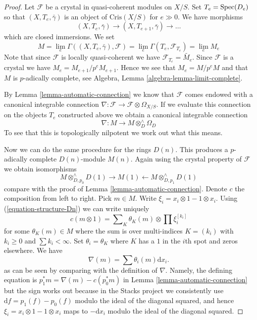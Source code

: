 \begin{proof}
Let $\mathcal{F}$ be a crystal in quasi-coherent modules on $X/S$.
Set $T_e = \mathop{\mathrm{Spec}}(D_e)$ so that $(X, T_e, \bar\gamma)$ is an object
of $\text{Cris}(X/S)$ for $e \gg 0$. We have morphisms
$$
(X, T_e, \bar\gamma) \to (X, T_{e + 1}, \bar\gamma) \to \ldots
$$
which are closed immersions. We set
$$
M =
\lim_e \Gamma((X, T_e, \bar\gamma), \mathcal{F}) =
\lim_e \Gamma(T_e, \mathcal{F}_{T_e}) = \lim_e M_e
$$
Note that since $\mathcal{F}$ is locally quasi-coherent we have
$\mathcal{F}_{T_e} = \widetilde{M_e}$. Since $\mathcal{F}$ is a
crystal we have $M_e = M_{e + 1}/p^eM_{e + 1}$. Hence we see that
$M_e = M/p^eM$ and that $M$ is $p$-adically complete, see
Algebra, Lemma \ref{algebra-lemma-limit-complete}.

\medskip\noindent
By Lemma \ref{lemma-automatic-connection} we know that $\mathcal{F}$
comes endowed with a canonical integrable connection
$\nabla : \mathcal{F} \to \mathcal{F} \otimes \Omega_{X/S}$.
If we evaluate this connection on the objects $T_e$ constructed above
we obtain a canonical integrable connection
$$
\nabla : M \longrightarrow M \otimes^\wedge_D \Omega_D
$$
To see that this is topologically nilpotent we work out what this means.

\medskip\noindent
Now we can do the same procedure for the rings $D(n)$.
This produces a $p$-adically complete $D(n)$-module $M(n)$. Again using
the crystal property of $\mathcal{F}$ we obtain isomorphisms
$$
M \otimes^\wedge_{D, p_0} D(1) \rightarrow M(1)
\leftarrow M \otimes^\wedge_{D, p_1} D(1)
$$
compare with the proof of Lemma \ref{lemma-automatic-connection}.
Denote $c$ the composition from left to right. Pick $m \in M$.
Write $\xi_i = x_i \otimes 1 - 1 \otimes x_i$.
Using (\ref{equation-structure-Dn}) we can write uniquely
$$
c(m \otimes 1) = \sum\nolimits_K \theta_K(m) \otimes \prod \xi_i^{[k_i]}
$$
for some $\theta_K(m) \in M$ where the sum is over multi-indices
$K = (k_i)$ with $k_i \geq 0$ and $\sum k_i < \infty$. Set
$\theta_i = \theta_K$ where $K$ has a $1$ in the $i$th spot and
zeros elsewhere. We have
$$
\nabla(m) = \sum \theta_i(m) \text{d}x_i.
$$
as can be seen by comparing with the definition of
$\nabla$. Namely, the defining equation is
$p_1^*m = \nabla(m) - c(p_0^*m)$ in Lemma \ref{lemma-automatic-connection}
but the sign works out because in the Stacks project we consistently use
$\text{d}f = p_1(f) - p_0(f)$ modulo the ideal of the diagonal squared,
and hence $\xi_i = x_i \otimes 1 - 1 \otimes x_i$ maps to $-\text{d}x_i$
modulo the ideal of the diagonal squared.


\end{proof}
